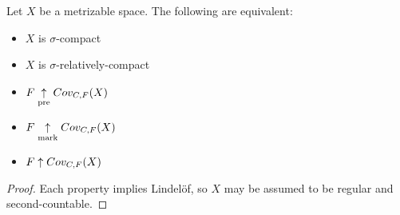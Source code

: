 \begin{cor}
  Let $X$ be a metrizable space. The following are equivalent:
  \begin{itemize}
    \item $X$ is $\sigma$-compact
    \item $X$ is $\sigma$-relatively-compact
    \item $F \underset{\text{pre}}{\uparrow} Cov_{C,F}(X)$
    \item $F \underset{\text{mark}}{\uparrow} Cov_{C,F}(X)$
    \item $F \uparrow Cov_{C,F}(X)$
  \end{itemize}
\end{cor}

\begin{proof}
  Each property implies Lindel\"of, so $X$ may be assumed to be
  regular and second-countable.
\end{proof}









